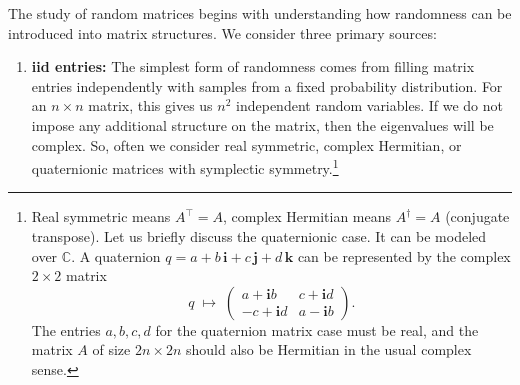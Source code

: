 \documentclass[letterpaper,11pt,oneside,reqno]{article}
\numberwithin{equation}{section}
\theoremstyle{definition}
\begin{document}
The study of random matrices begins with understanding how randomness can be introduced into matrix structures. We consider three primary sources:
\begin{enumerate}
\item \textbf{iid entries:}
The simplest form of randomness comes from filling matrix entries independently with samples from a fixed probability distribution. For an $n \times n$ matrix, this gives us $n^2$ independent random variables.
If we do not impose any additional structure on the matrix, then the eigenvalues
will be complex. So, often we consider real symmetric, complex Hermitian, or quaternionic matrices with
symplectic symmetry.\footnote{Real symmetric means $A^\top=A$, complex Hermitian means $A^\dagger=A$ (conjugate transpose).
	Let us briefly discuss the quaternionic case. It can be modeled over $\mathbb{C}$. A quaternion
	$q = a + b\,\mathbf{i} + c\,\mathbf{j} + d\,\mathbf{k}$
	can be represented by the complex $2\times 2$ matrix
	\[
	q \;\longmapsto\;
	\begin{pmatrix}
	a + \mathbf{i}b & c + \mathbf{i}d \\
	-c + \mathbf{i}d & a - \mathbf{i}b
	\end{pmatrix}.
	\]
	The entries $a,b,c,d$ for the quaternion matrix case must be real, and the matrix
$A$ of size $2n\times 2n$ should also be Hermitian in the usual complex sense.\label{fn:quaternion}}



\end{enumerate}
\end{document}
